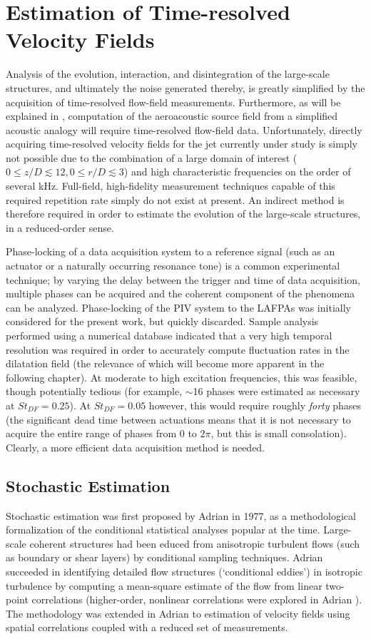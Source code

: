 \chapter{Estimation of Time-resolved Velocity Fields}
\label{sect:velocity}
Analysis of the evolution, interaction, and disintegration of the large-scale structures, and ultimately the noise generated thereby, is greatly simplified by the acquisition of time-resolved flow-field measurements.
Furthermore, as will be explained in , computation of the aeroacoustic source field from a simplified acoustic analogy will require time-resolved flow-field data.
Unfortunately, directly acquiring time-resolved velocity fields for the jet currently under study is simply not possible due to the combination of a large domain of interest ($0 \leq z/D \lesssim 12, 0 \leq r/D \lesssim 3$) and high characteristic frequencies on the order of several kHz.
Full-field, high-fidelity measurement techniques capable of this required repetition rate simply do not exist at present.
An indirect method is therefore required in order to estimate the evolution of the large-scale structures, in a reduced-order sense.

Phase-locking of a data acquisition system to a reference signal (such as an actuator or a naturally occurring resonance tone) is a common experimental technique; by varying the delay between the trigger and time of data acquisition, multiple phases can be acquired and the coherent component of the phenomena can be analyzed.
Phase-locking of the PIV system to the LAFPAs was initially considered for the present work, but quickly discarded.
Sample analysis performed using a numerical database indicated that a very high temporal resolution was required in order to accurately compute fluctuation rates in the dilatation field (the relevance of which will become more apparent in the following chapter).
At moderate to high excitation frequencies, this was feasible, though potentially tedious (for example, $\sim$16 phases were estimated as necessary at $St_{DF} =0.25$).
At $St_{DF} =0.05$ however, this would require roughly \textit{forty} phases (the significant dead time between actuations means that it is not necessary to acquire the entire range of phases from $0$ to $2\pi$, but this is small consolation).
Clearly, a more efficient data acquisition method is needed.
\section{Stochastic Estimation}
Stochastic estimation was first proposed by Adrian \citep{Adrian1977} in 1977, as a methodological formalization of the conditional statistical analyses popular at the time. 
Large-scale coherent structures had been educed from anisotropic turbulent flows (such as boundary or shear layers) by conditional sampling techniques.
Adrian succeeded in identifying detailed flow structures (`conditional eddies') in isotropic turbulence by computing a mean-square estimate of the flow from linear two-point correlations (higher-order, nonlinear correlations were explored in Adrian \citep{Adrian1979}). 
The methodology was extended in Adrian \citep{Adrian1994} to estimation of velocity fields using spatial correlations coupled with a reduced set of measurements.

